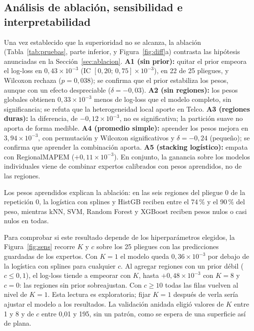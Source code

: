 \documentclass[11pt,a4paper]{article}
\begin{document}
\subsection{Análisis de ablación, sensibilidad e interpretabilidad}
Una vez establecido que la superioridad no se alcanza, la ablación (Tabla~\ref{tab:pruebas}, parte inferior, y Figura~\ref{fig:diff}a) contrasta las hipótesis anunciadas en la Sección~\ref{sec:ablacion}. \textbf{A1 (sin prior):} quitar el prior empeora el log-loss en $0{,}43\times10^{-3}$ (IC $[0{,}20;\,0{,}75]\times10^{-3}$), en 22 de 25 pliegues, y Wilcoxon rechaza ($p=0{,}038$); se confirma que el prior estabiliza los pesos, aunque con un efecto despreciable ($\delta=-0{,}03$). \textbf{A2 (sin regiones):} los pesos globales obtienen $0{,}33\times10^{-3}$ menos de log-loss que el modelo completo, sin significancia; se refuta que la heterogeneidad local aporte en Telco. \textbf{A3 (regiones duras):} la diferencia, de $-0{,}12\times10^{-3}$, no es significativa; la partición suave no aporta de forma medible. \textbf{A4 (promedio simple):} aprender los pesos mejora en $3{,}94\times10^{-3}$, con permutación y Wilcoxon significativos y $\delta=-0{,}24$ (pequeño); se confirma que aprender la combinación aporta. \textbf{A5 (stacking logístico):} empata con RegionalMAPEM ($+0{,}11\times10^{-3}$). En conjunto, la ganancia sobre los modelos individuales viene de combinar expertos calibrados con pesos aprendidos, no de las regiones.

Los pesos aprendidos explican la ablación: en las seis regiones del pliegue 0 de la repetición 0, la logística con splines y HistGB reciben entre el 74\,\% y el 90\,\% del peso, mientras kNN, SVM, Random Forest y XGBoost reciben pesos nulos o casi nulos en todas.

Para comprobar si este resultado depende de los hiperparámetros elegidos, la Figura~\ref{fig:sens} recorre $K$ y $c$ sobre los 25 pliegues con las predicciones guardadas de los expertos. Con $K=1$ el modelo queda $0{,}36\times10^{-3}$ por debajo de la logística con splines para cualquier $c$. Al agregar regiones con un prior débil ($c\le0{,}1$), el log-loss tiende a empeorar con $K$, hasta $+0{,}48\times10^{-3}$ con $K=8$ y $c=0$: las regiones sin prior sobreajustan. Con $c\ge10$ todas las filas vuelven al nivel de $K=1$. Esta lectura es exploratoria; fijar $K=1$ después de verla sería ajustar el modelo a los resultados. La validación anidada eligió valores de $K$ entre 1 y 8 y de $c$ entre 0,01 y 195, sin un patrón, como se espera de una superficie así de plana.
\end{document}
